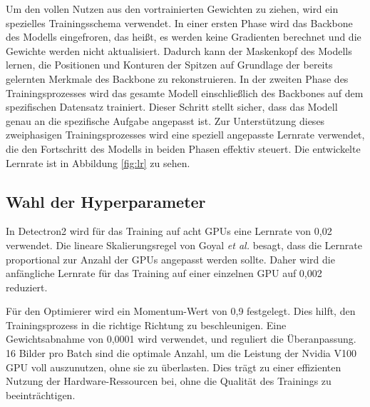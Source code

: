 Um den vollen Nutzen aus den vortrainierten Gewichten zu ziehen, wird ein spezielles Trainingsschema verwendet. In einer ersten Phase wird das Backbone des Modells \glqq eingefroren\grqq{}, das heißt, es werden keine Gradienten berechnet und die Gewichte werden nicht aktualisiert. Dadurch kann der Maskenkopf des Modells lernen, die Positionen und Konturen der Spitzen auf Grundlage der bereits gelernten Merkmale des Backbone zu rekonstruieren.
In der zweiten Phase des Trainingsprozesses wird das gesamte Modell einschließlich des Backbones auf dem spezifischen Datensatz trainiert. Dieser Schritt stellt sicher, dass das Modell genau an die spezifische Aufgabe angepasst ist. Zur Unterstützung dieses zweiphasigen Trainingsprozesses wird eine speziell angepasste Lernrate verwendet, die den Fortschritt des Modells in beiden Phasen effektiv steuert. Die entwickelte Lernrate ist in Abbildung \ref{fig:lr} zu sehen.
\subsection{Wahl der Hyperparameter}
\label{sec:hyperp}
In Detectron2 wird für das Training auf acht GPUs eine Lernrate von 0,02 verwendet. Die lineare Skalierungsregel von Goyal \textit{et al.} \cite{1706.02677} besagt, dass die Lernrate proportional zur Anzahl der GPUs angepasst werden sollte. Daher wird die anfängliche Lernrate für das Training auf einer einzelnen GPU auf 0,002 reduziert.

Für den Optimierer wird ein Momentum-Wert von 0,9 festgelegt. Dies hilft, den Trainingsprozess in die richtige Richtung zu beschleunigen. Eine Gewichtsabnahme von 0,0001 wird verwendet, und reguliert  die Überanpassung.
16 Bilder pro Batch sind die optimale Anzahl, um die Leistung der Nvidia V100 GPU voll auszunutzen, ohne sie zu überlasten. Dies trägt zu einer effizienten Nutzung der Hardware-Ressourcen bei, ohne die Qualität des Trainings zu beeinträchtigen.

